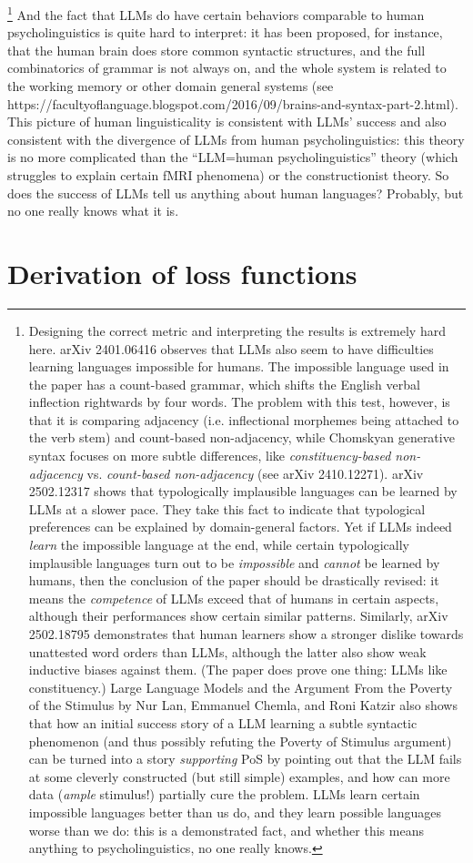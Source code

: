 \documentclass[hyperref, a4paper, 12pt]{report}
\begin{document}
\footnote{
    Designing the correct metric and interpreting the results is extremely hard here.
    arXiv 2401.06416 observes that LLMs also seem to have difficulties learning languages impossible for humans.
    The impossible language used in the paper has a count-based grammar,
    which shifts the English verbal inflection rightwards by four words.
    The problem with this test, however, is that it is comparing adjacency (i.e. inflectional morphemes being attached to the verb stem) and count-based non-adjacency,
    while Chomskyan generative syntax focuses on more subtle differences,
    like \emph{constituency-based non-adjacency} vs. \emph{count-based non-adjacency}
    (see arXiv 2410.12271).
    arXiv 2502.12317 shows that typologically implausible languages can be learned by LLMs at a slower pace.
    They take this fact to indicate that typological preferences can be explained by domain-general factors.
    Yet if LLMs indeed \emph{learn} the impossible language at the end,
    while certain typologically implausible languages turn out to be \emph{impossible} and \emph{cannot} be learned by humans,
    then the conclusion of the paper should be drastically revised:
    it means the \emph{competence} of LLMs exceed that of humans in certain aspects,
    although their performances show certain similar patterns.
    Similarly, arXiv 2502.18795 demonstrates that human learners show a stronger dislike towards unattested word orders than LLMs,
    although the latter also show weak inductive biases against them.
    (The paper does prove one thing: LLMs like constituency.)
    Large Language Models and the Argument From the Poverty of the Stimulus by Nur Lan, Emmanuel Chemla, and Roni Katzir also shows that 
    how an initial success story of a LLM learning a subtle syntactic phenomenon
    (and thus possibly refuting the Poverty of Stimulus argument)
    can be turned into a story \emph{supporting} PoS by pointing out that the LLM
    fails at some cleverly constructed (but still simple) examples,
    and how can more data (\emph{ample} stimulus!) partially cure the problem.
    LLMs learn certain impossible languages better than us do,
    and they learn possible languages worse than we do:
    this is a demonstrated fact,
    and whether this means anything to psycholinguistics,
    no one really knows.
}
And the fact that LLMs do have certain behaviors comparable to human psycholinguistics
is quite hard to interpret:
it has been proposed, for instance, that the human brain does store common syntactic structures, and the full combinatorics of grammar is not always on,
and the whole system is related to the working memory or other domain general systems (see https://facultyoflanguage.blogspot.com/2016/09/brains-and-syntax-part-2.html).
This picture of human linguisticality is consistent with LLMs' success
and also consistent with the divergence of LLMs from human psycholinguistics:
this theory is no more complicated than the ``LLM=human psycholinguistics'' theory (which struggles to explain certain fMRI phenomena) or the constructionist theory.
So does the success of LLMs tell us anything about human languages?
Probably, but no one really knows what it is.

\chapter{Derivation of loss functions}
\end{document}
